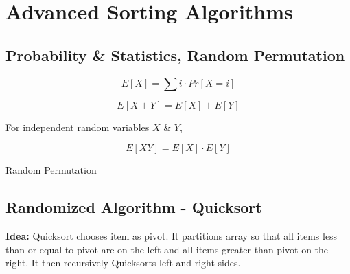 \documentclass[10pt]{article}
\begin{document}
\newpage

\section{Advanced Sorting Algorithms}

\subsection{Probability \& Statistics, Random Permutation}

$$
E[X] = \sum i \cdot Pr[X = i]
$$

$$
E[X+Y] = E[X] + E[Y]
$$

For independent random variables $X$ \& $Y$, 

$$
E[XY] = E[X] \cdot E[Y]
$$

\begin{algorithm}
	\SetAlgoLined
	\caption{Random Permutation}
\end{algorithm}

\subsection{Randomized Algorithm - Quicksort}

\textbf{Idea:} Quicksort chooses item as pivot. It partitions array so that all items less than or equal to pivot are on the left and all items greater than pivot on the right. It then recursively Quicksorts left and right sides.
\end{document}
